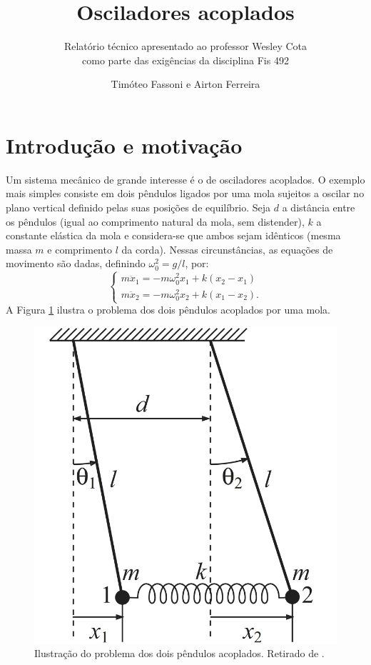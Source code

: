 \documentclass[a4paper, 11pt]{article}
\title{\textbf{Osciladores acoplados}}
\subtitle{Relatório técnico apresentado ao professor Wesley Cota\\ como parte das exigências da disciplina Fis 492}
\author{Timóteo Fassoni e Airton Ferreira}
\begin{document}
\maketitle

\section{Introdução e motivação}


	Um sistema mecânico de grande interesse é o de osciladores acoplados. O exemplo mais simples consiste em dois pêndulos ligados por uma mola sujeitos a oscilar no plano vertical definido pelas suas posições de equilíbrio. Seja $d$ a distância entre os pêndulos (igual ao comprimento natural da mola, sem distender), $k$ a constante elástica da mola e considera-se que ambos sejam idênticos (mesma massa $m$ e comprimento $l$ da corda). Nessas circunstâncias, as equações de movimento são dadas, definindo $\omega_0^2=g/l$, por:
	\begin{equation}\label{eq :: equação do sistema}
	\begin{cases}
	m\ddot{x}_1 = - m\omega_0^2x_1 + k(x_2-x_1)\\
	m\ddot{x}_2 = - m\omega_0^2x_2 + k(x_1-x_2).
	\end{cases}
	\end{equation}
    A Figura \ref{figura :: pendulos acoplados} ilustra o problema dos dois pêndulos acoplados por uma mola.
    
    \begin{figure}[h!]
        \centering
        \includegraphics[width=0.3\linewidth]{pendulos_acoplados.jpg}
        \caption{Ilustração do problema dos dois pêndulos acoplados. Retirado de \cite{moyses_2}.
        \label{figura :: pendulos acoplados}}
    \end{figure}
\end{document}
